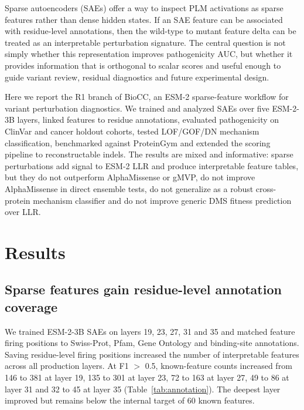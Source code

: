 \documentclass[pdflatex,sn-nature]{sn-jnl}
\begin{document}
Sparse autoencoders (SAEs) offer a way to inspect PLM activations as sparse features rather than dense hidden states. If an SAE feature can be associated with residue-level annotations, then the wild-type to mutant feature delta can be treated as an interpretable perturbation signature. The central question is not simply whether this representation improves pathogenicity AUC, but whether it provides information that is orthogonal to scalar scores and useful enough to guide variant review, residual diagnostics and future experimental design.

Here we report the R1 branch of BioCC, an ESM-2 sparse-feature workflow for variant perturbation diagnostics. We trained and analyzed SAEs over five ESM-2-3B layers, linked features to residue annotations, evaluated pathogenicity on ClinVar and cancer holdout cohorts, tested LOF/GOF/DN mechanism classification, benchmarked against ProteinGym and extended the scoring pipeline to reconstructable indels. The results are mixed and informative: sparse perturbations add signal to ESM-2 LLR and produce interpretable feature tables, but they do not outperform AlphaMissense or gMVP, do not improve AlphaMissense in direct ensemble tests, do not generalize as a robust cross-protein mechanism classifier and do not improve generic DMS fitness prediction over LLR.

\section{Results}\label{sec:results}

\subsection{Sparse features gain residue-level annotation coverage}

We trained ESM-2-3B SAEs on layers 19, 23, 27, 31 and 35 and matched feature firing positions to Swiss-Prot, Pfam, Gene Ontology and binding-site annotations. Saving residue-level firing positions increased the number of interpretable features across all production layers. At F1 $>$ 0.5, known-feature counts increased from 146 to 381 at layer 19, 135 to 301 at layer 23, 72 to 163 at layer 27, 49 to 86 at layer 31 and 32 to 45 at layer 35 (Table~\ref{tab:annotation}). The deepest layer improved but remains below the internal target of 60 known features.
\end{document}
